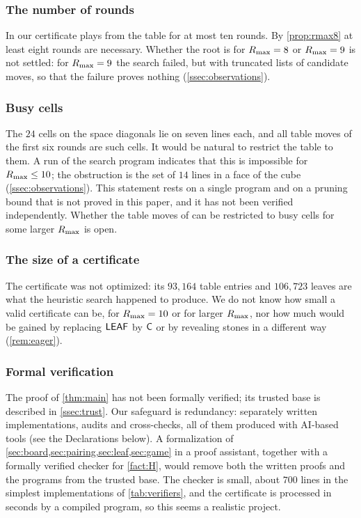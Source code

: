 \subsubsection*{The number of rounds}
In our certificate \Breaker{} plays from the table for at most ten rounds. By \cref{prop:rmax8} at least
eight rounds are necessary. Whether the root is \WON{} for $R_{\max}=8$ or $R_{\max}=9$ is not settled: for
$R_{\max}=9$ the search failed, but with truncated lists of candidate moves, so that the failure proves
nothing (\cref{ssec:observations}).

\subsubsection*{Busy cells}
The $24$ cells on the space diagonals lie on seven lines each, and all table moves of the first six
rounds are such cells. It would be natural to restrict the table to them. A run of the search program
indicates that this is impossible for $R_{\max}\le 10$; the obstruction is the set of
$14$ lines in a face of the cube (\cref{ssec:observations}). This statement rests on a single program
and on a pruning bound that is not proved in this paper, and it has not been verified independently.
Whether the table moves of \Breaker{} can be restricted to busy cells
for some larger $R_{\max}$ is open.

\subsubsection*{The size of a certificate}
The certificate was not optimized: its $93{,}164$ table entries and $106{,}723$ leaves are what the
heuristic search happened to produce. We do not know how small a valid certificate
can be, for $R_{\max}=10$ or for larger $R_{\max}$, nor how much would be gained by replacing $\mathsf{LEAF}$ by
$\mathsf{C}$ or by revealing stones in a different way (\cref{rem:eager}).

\subsubsection*{Formal verification}
The proof of \cref{thm:main} has not been formally verified; its trusted base is described in
\cref{ssec:trust}. Our
safeguard is redundancy: separately written implementations, audits and cross-checks, all of them produced
with AI-based tools (see the Declarations below). A formalization of
\cref{sec:board,sec:pairing,sec:leaf,sec:game} in a proof assistant, together with a formally verified
checker for \cref{fact:H}, would remove both the written proofs and the programs from the trusted base.
The checker is small, about $700$ lines in the simplest implementations of \cref{tab:verifiers}, and
the certificate is processed in seconds by a compiled program, so this seems a realistic project.

